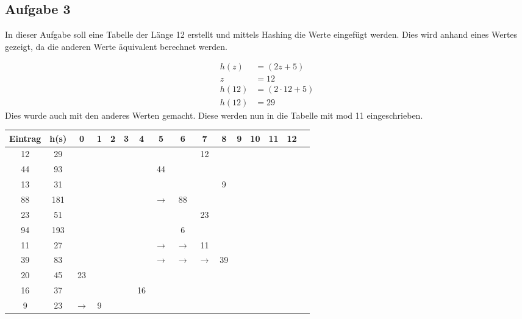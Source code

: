 \documentclass[11pt]{article}
\begin{document}
\newpage

\subsection*{Aufgabe 3}
In dieser Aufgabe soll eine Tabelle der Länge 12 erstellt und mittels Hashing
die Werte eingefügt werden. Dies wird anhand eines Wertes gezeigt, da die 
anderen Werte äquivalent berechnet werden.

\begin{align*}
	h(z) &= (2z+5)\\
	z &= 12\\
	h(12) &= (2 \cdot 12 + 5)\\
	h(12) &= 29 
\end{align*}
Dies wurde auch mit den anderes Werten gemacht. Diese werden nun in die Tabelle mit mod 11 eingeschrieben.
\begin{table}[h!]
	\centering
	\begin{tabular}{|c|c|c|c|c|c|c|c|c|c|c|c|c|c|c|c|}
		\hline\hline
		\textbf{Eintrag}&\textbf{h(s)} & 0 & 1 & 2 & 3 & 4 & 5 & 6 & 7 & 8 & 9 & 10 & 11 & 12 \\
		\hline
		12 & 29 & & & & & & & & 12 & & & & &\\
		\hline
		44 & 93 & & & & & & 44 & & & & & & &\\
		\hline
		13 & 31 & & & & & & & & & 9 & & & &\\
		\hline
		88 & 181 & & & & & & $\rightarrow$ & 88 & & & & & &\\
		\hline
		23 & 51 & & & & & & & & 23 & & & & &\\
		\hline
		94 & 193 & & & & & & & 6 & & & & & &\\
		\hline
		11 & 27 & & & & & & $\rightarrow$ & $\rightarrow$ & 11 & & & & &\\
		\hline
		39 & 83 & & & & & & $\rightarrow$ & $\rightarrow$ & $\rightarrow$ & 39 & & & &\\
		\hline
		20 & 45 & 23 & & & & & & & & & & & &\\
		\hline
		16 & 37 & & & & & 16 & &  & & & & & &\\
		\hline
		9 & 23 & $\rightarrow$ & 9 & & & & & & & & & & &\\
		\hline
	\end{tabular}
\end{table}
\end{document}
